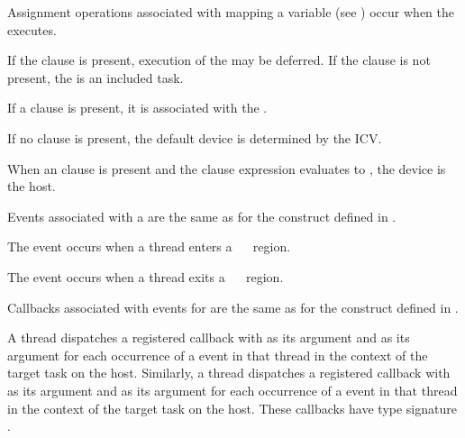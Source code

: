 Assignment operations associated with mapping a variable (see 
) occur when the  executes.

If the  clause is present, execution of the  may be 
deferred.  If the  clause is not present, the  is an 
included task.

If a  clause is present, it is associated with the .

If no  clause is present, the default device is determined by the 
 ICV.

When an  clause is present and the  clause expression evaluates 
to , the device is the host.

\events

Events associated with a  are the same as for the  
construct defined in .

The  event occurs when a thread enters a
~~ region.

The  event occurs when a thread exits a
~~ region.

\tools

Callbacks associated with events for  are the same as
for the  construct defined in .

A thread dispatches a registered  callback with
 as its  argument and
 as its  argument for each occurrence
of a  event in that thread in the context of the
target task on the host. Similarly, a thread dispatches a registered
 callback with  as its
 argument and  as its 
argument for each occurrence of a  event in that thread
in the context of the target task on the host. These callbacks have
type signature . 

